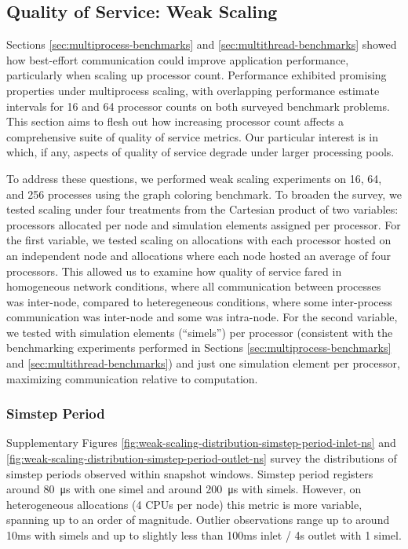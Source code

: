 \subsection{Quality of Service: Weak Scaling} \label{sec:weak-scaling}

Sections \ref{sec:multiprocess-benchmarks} and \ref{sec:multithread-benchmarks} showed how best-effort communication could improve application performance, particularly when scaling up processor count.
Performance exhibited promising properties under multiprocess scaling, with overlapping performance estimate intervals for 16 and 64 processor counts on both surveyed benchmark problems.
This section aims to flesh out how increasing processor count affects a comprehensive suite of quality of service metrics.
Our particular interest is in which, if any, aspects of quality of service degrade under larger processing pools.

To address these questions, we performed weak scaling experiments on 16, 64, and 256 processes using the graph coloring benchmark.
To broaden the survey, we tested scaling under four treatments from the Cartesian product of two variables: processors allocated per node and simulation elements assigned per processor.
For the first variable, we tested scaling on allocations with each processor hosted on an independent node and allocations where each node hosted an average of four processors.
This allowed us to examine how quality of service fared in homogeneous network conditions, where all communication between processes was inter-node, compared to heteregeneous conditions, where some inter-process communication was inter-node and some was intra-node.
For the second variable, we tested with  simulation elements (``simels'') per processor (consistent with the benchmarking experiments performed in Sections \ref{sec:multiprocess-benchmarks} and \ref{sec:multithread-benchmarks}) and just one simulation element per processor, maximizing communication relative to computation.

\subsubsection{Simstep Period}

Supplementary Figures \ref{fig:weak-scaling-distribution-simstep-period-inlet-ns} and \ref{fig:weak-scaling-distribution-simstep-period-outlet-ns} survey the distributions of simstep periods observed within snapshot windows.
Simstep period registers around \SI{80}{\micro\second} with one simel and around \SI{200}{\micro\second} with  simels.
However, on heterogeneous allocations (4 CPUs per node) this metric is more variable, spanning up to an order of magnitude.
Outlier observations range up to around 10ms with  simels and up to slightly less than 100ms inlet / 4s outlet with 1 simel.

